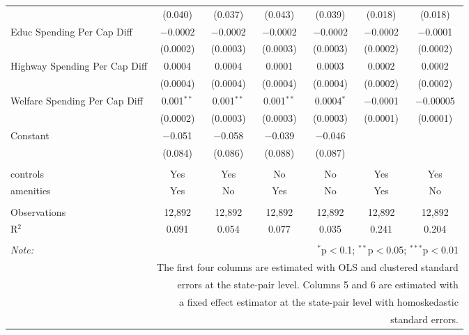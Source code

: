 \begin{table}[!htbp]
\begin{tabular}{@{\extracolsep{5pt}}lcccccc}
  & (0.040) & (0.037) & (0.043) & (0.039) & (0.018) & (0.018) \\ 
  Educ Spending Per Cap Diff & $-$0.0002 & $-$0.0002 & $-$0.0002 & $-$0.0002 & $-$0.0002 & $-$0.0001 \\ 
  & (0.0002) & (0.0003) & (0.0003) & (0.0003) & (0.0002) & (0.0002) \\ 
  Highway Spending Per Cap Diff & 0.0004 & 0.0004 & 0.0001 & 0.0003 & 0.0002 & 0.0002 \\ 
  & (0.0004) & (0.0004) & (0.0004) & (0.0004) & (0.0002) & (0.0002) \\ 
  Welfare Spending Per Cap Diff & 0.001$^{**}$ & 0.001$^{**}$ & 0.001$^{**}$ & 0.0004$^{*}$ & $-$0.0001 & $-$0.00005 \\ 
  & (0.0002) & (0.0003) & (0.0003) & (0.0003) & (0.0001) & (0.0001) \\ 
  Constant & $-$0.051 & $-$0.058 & $-$0.039 & $-$0.046 &  &  \\ 
  & (0.084) & (0.086) & (0.088) & (0.087) &  &  \\ 
 \hline \\[-1.8ex] 
controls & Yes & Yes & No & No & Yes & Yes \\ 
amenities & Yes & No & Yes & No & Yes & No \\ 
\hline \\[-1.8ex] 
Observations & 12,892 & 12,892 & 12,892 & 12,892 & 12,892 & 12,892 \\ 
R$^{2}$ & 0.091 & 0.054 & 0.077 & 0.035 & 0.241 & 0.204 \\ 
\hline 
\hline \\[-1.8ex] 
\textit{Note:}  & \multicolumn{6}{r}{$^{*}$p$<$0.1; $^{**}$p$<$0.05; $^{***}$p$<$0.01} \\ 
 & \multicolumn{6}{r}{The first four columns are estimated with OLS and clustered standard} \\ 
 & \multicolumn{6}{r}{ errors at the state-pair level. Columns 5 and 6 are estimated with} \\ 
 & \multicolumn{6}{r}{a fixed effect estimator at the state-pair level with homoskedastic} \\ 
 & \multicolumn{6}{r}{standard errors.} \\ 
\end{tabular} 
\end{table} 
